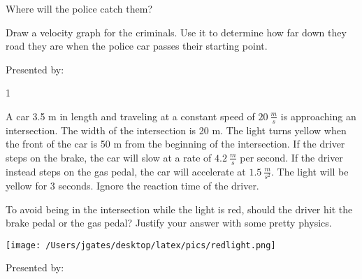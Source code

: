 \bigskip
Where will the police catch them?

\vfill

Draw a velocity graph for the criminals.  Use it to determine how far down they road they are when the police car passes their starting point.
\vfill

\newpage

\AddToShipoutPicture*{\BackgroundPic}


\bigskip
{\large Presented by: }\underline{\hspace{5cm}}




\vfill
\newpage


\AddToShipoutPicture*{\BackgroundPic}

\addtocounter {ProbNum} {1}

 
{\bf \Large{}} A car 3.5 m in length and traveling at a constant speed of ${20~\tfrac{m}{s}}$ is approaching an intersection. The width of the intersection is 20 m. The light turns yellow when the front of the car is 50 m from the beginning of the intersection. If the driver steps on the brake, the car will slow at a rate of ${4.2~\tfrac{m}{s}}$ per second. If the driver instead steps on the gas pedal, the car will accelerate at ${1.5~\tfrac{m}{s^2}}$. The light will be yellow for 3 seconds. Ignore the reaction time of the driver. 

\bigskip
To avoid being in the intersection while the light is red, should the driver hit the brake pedal or the gas pedal? Justify your answer with some pretty physics.

\hfill \texttt{[image: /Users/jgates/desktop/latex/pics/redlight.png]}


\vfill
\newpage


\AddToShipoutPicture*{\BackgroundPic}


\bigskip
{\large Presented by: }\underline{\hspace{5cm}}




